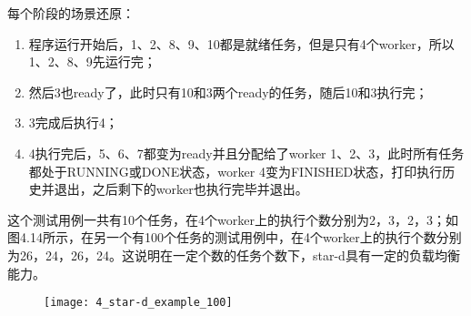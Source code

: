 每个阶段的场景还原：

\begin{enumerate}
	\item 程序运行开始后，1、2、8、9、10都是就绪任务，但是只有4个worker，所以1、2、8、9先运行完；
	\item 然后3也ready了，此时只有10和3两个ready的任务，随后10和3执行完；
	\item 3完成后执行4；
	\item 4执行完后，5、6、7都变为ready并且分配给了worker 1、2、3，此时所有任务都处于RUNNING或DONE状态，worker 4变为FINISHED状态，打印执行历史并退出，之后剩下的worker也执行完毕并退出。
\end{enumerate}

这个测试用例一共有10个任务，在4个worker上的执行个数分别为2，3，2，3；如图4.14所示，在另一个有100个任务的测试用例中，在4个worker上的执行个数分别为26，24，26，24。这说明在一定个数的任务个数下，star-d具有一定的负载均衡能力。

\begin{figure}[!htbp]
    \centering
    \texttt{[image: 4\_star-d\_example\_100]}
    \label{fig:4_star-d_example_100}
\end{figure}



